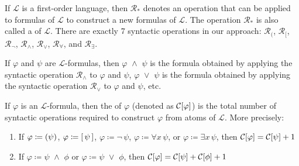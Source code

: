 \begin{dfn}
     \label{dfn:first-order-language-syntactic-operations}
    If \( \mathcal{L} \) is a first-order language, then \( \mathcal{R}_{\ast} \) denotes an operation that can be applied to formulas of \( \mathcal{L} \)
    to construct a new formulas of \( \mathcal{L} \).
    The operation \( \mathcal{R}_{\ast} \) is also called a  of \( \mathcal{L} \).
    There are exactly 7 syntactic operations in our approach:  \( \mathcal{R}_{(} \), \( \mathcal{R}_{[} \),
    \( \mathcal{R}_{\lnot} \), \( \mathcal{R}_{\land} \), \( \mathcal{R}_{\lor} \), \( \mathcal{R}_{\forall} \), and \( \mathcal{R}_{\exists} \).
\end{dfn}

\begin{eg}
    If \( \varphi \) and \( \psi \) are \( \mathcal{L} \)-formulas, then \( \varphi \,\,{\land}\,\, \psi \) is the formula obtained by applying
    the syntactic operation \( \mathcal{R}_{\land} \) to \( \varphi \) and \( \psi \), \( \varphi \,\,{\lor}\,\, \psi \) is the formula obtained
    by applying the syntactic operation \( \mathcal{R}_{\lor} \) to \( \varphi \) and \( \psi \), etc.
\end{eg}

\begin{dfn}[Complexity]
     \label{dfn:first-order-language-complexity-of-formulas}
    If \( \varphi \) is an \( \mathcal{L} \)-formula, then the  of \( \varphi \) (denoted as \( \folcomplexityofformula{\varphi} \))
    is the total number of syntactic operations required to construct \( \varphi \) from atoms of \( \mathcal{L} \).
    More precisely:
    \begin{enumerate}[topsep=2pt,label=\textup{\texttt{(\alph*)}}]
        \item If \( \varphi \coloneq \mleft( \psi \mright) \), \( \varphi \coloneq \mleft[ \,\psi\, \mright] \), \( \varphi \coloneq \lnot \, \psi \),
            \( \varphi \coloneq \forall x \, \psi \), or \( \varphi \coloneq \exists x \, \psi \),
            then \( \folcomplexityofformula{\varphi} = \folcomplexityofformula{\psi} + 1 \)
        \item If \( \varphi \coloneq \psi \,\,{\land}\,\, \phi \) or \( \varphi \coloneq \psi \,\,{\lor}\,\, \phi \),
            then \( \folcomplexityofformula{\varphi} = \folcomplexityofformula{\psi} + \folcomplexityofformula{\phi} + 1 \)
    \end{enumerate}
\end{dfn}

